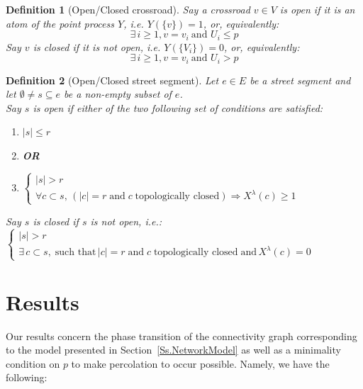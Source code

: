 \documentclass[10pt,a4paper]{amsart}
\theoremstyle{exampstyle}
\newtheorem{Definition}{Definition}
\theoremstyle{exampnotations}
\begin{document}
\begin{Definition}[Open/Closed crossroad]
\label{Def.open/crossroad}
Say a crossroad $v \in V$ is \emph{open} if it is an atom of the point process $Y$, i.e. $Y(\lbrace v\rbrace) = 1$, or, equivalently:
\begin{equation*}
   \exists \,  i \geq 1, v=v_i \: \text{and } U_i \leq p
\end{equation*}
Say $v$ is \emph{closed} if it is not open, i.e. $Y(\lbrace V_i \rbrace) = 0$, or, equivalently:
\begin{equation*}
   \exists \,  i \geq 1, v=v_i \: \text{and } U_i > p
\end{equation*}
\end{Definition}

\begin{Definition}[Open/Closed street segment]
\label{Def.open/closed/subcritical}
Let $e \in E$ be a street segment and let $\emptyset \neq s \subseteq e$ be a non-empty subset of $e$.\\ Say $s$ is \emph{open} if either of the two following set of conditions are satisfied:
\begin{enumerate}
\item $\vert s \vert \leq r$
\vspace{.2 cm}
\item[]\textbf{OR}
\vspace{.2 cm}
\item $\left\{
\begin{array}{l}
\vert s \vert > r \\
\forall c \subset s, \, (\vert c \vert = r \; \text{and} \; c  \; \text{topologically closed} )\Rightarrow X^{\lambda}(c) \geq 1
\end{array}
\right.$
\end{enumerate}
Say $s$ is \emph{closed} if $s$ is not open, i.e.: \\
 $\left\{
\begin{array}{l}
\vert s \vert > r \\
\exists \, c \subset s, \; \text{such that} \, \vert c \vert = r \; \text{and} \; c  \; \text{topologically closed} \; \text{and} \,  X^{\lambda}(c) = 0
\end{array}
\right.$
\end{Definition}

\section{Results}
\label{S.Results}
Our results concern the phase transition of the connectivity graph corresponding to the model presented in Section~\ref{Ss.NetworkModel} as well as a minimality condition on $p$ to make percolation to occur possible. Namely, we have the following:
\end{document}
